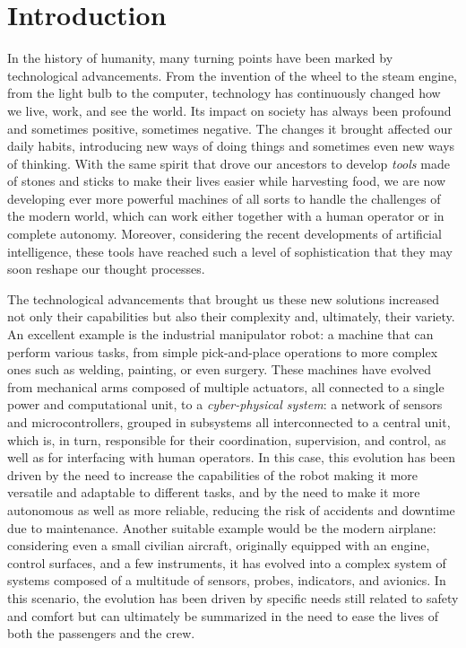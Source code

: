 \chapter{Introduction}
\label{ch:intro}
\doublespacing
\vspace{-1.2cm}

In the history of humanity, many turning points have been marked by technological advancements. From the invention of the wheel to the steam engine, from the light bulb to the computer, technology has continuously changed how we live, work, and see the world. Its impact on society has always been profound and sometimes positive, sometimes negative. The changes it brought affected our daily habits, introducing new ways of doing things and sometimes even new ways of thinking. With the same spirit that drove our ancestors to develop \emph{tools} made of stones and sticks to make their lives easier while harvesting food, we are now developing ever more powerful machines of all sorts to handle the challenges of the modern world, which can work either together with a human operator or in complete autonomy. Moreover, considering the recent developments of artificial intelligence, these tools have reached such a level of sophistication that they may soon reshape our thought processes.

The technological advancements that brought us these new solutions increased not only their capabilities but also their complexity and, ultimately, their variety. An excellent example is the industrial manipulator robot: a machine that can perform various tasks, from simple pick-and-place operations to more complex ones such as welding, painting, or even surgery. These machines have evolved from mechanical arms composed of multiple actuators, all connected to a single power and computational unit, to a \emph{cyber-physical system}: a network of sensors and microcontrollers, grouped in subsystems all interconnected to a central unit, which is, in turn, responsible for their coordination, supervision, and control, as well as for interfacing with human operators. In this case, this evolution has been driven by the need to increase the capabilities of the robot making it more versatile and adaptable to different tasks, and by the need to make it more autonomous as well as more reliable, reducing the risk of accidents and downtime due to maintenance. Another suitable example would be the modern airplane: considering even a small civilian aircraft, originally equipped with an engine, control surfaces, and a few instruments, it has evolved into a complex system of systems composed of a multitude of sensors, probes, indicators, and avionics. In this scenario, the evolution has been driven by specific needs still related to safety and comfort but can ultimately be summarized in the need to ease the lives of both the passengers and the crew.

